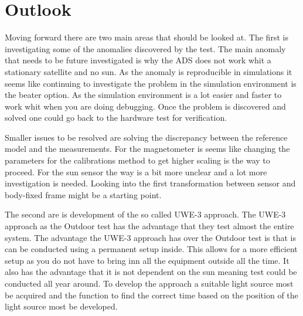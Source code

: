 \chapter{Outlook}
\label{sec-outlook}
Moving forward there are two main areas that should be looked at. The first is investigating some of the anomalies discovered by the test. The main anomaly that needs to be future investigated is why the ADS does not work whit a stationary satellite and no sun. As the anomaly is reproducible in simulations it seems like continuing to investigate the problem in the simulation environment is the beater option. As the simulation environment is a lot easier and faster to work whit when you are doing debugging. Once the problem is discovered and solved one could go back to the hardware test for verification. 

Smaller issues to be resolved are solving the discrepancy between the reference model and the measurements. For the magnetometer is seems like changing the parameters for the calibrations method to get higher scaling is the way to proceed. For the sun sensor the way is a bit more unclear and a lot more investigation is needed. Looking into the first transformation between sensor and body-fixed frame might be a starting point. 

The second are is development of the so called UWE-3 approach. The UWE-3 approach as the Outdoor test has the advantage that they test almost the entire system. The advantage the UWE-3 approach has over the Outdoor test is that is can be conducted using a permanent setup inside. This allows for a more efficient setup as you do not have to bring inn all the equipment outside all the time. It also has the advantage that it is not dependent on the sun meaning test could be conducted all year around. To develop the approach a suitable light source most be acquired and the function to find the correct time based on the position of the light source most be developed.                     